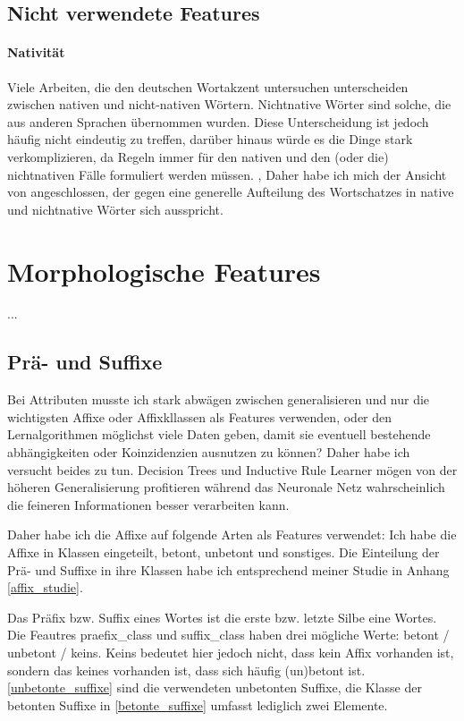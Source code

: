 \subsection{Nicht verwendete Features}
\paragraph*{Nativität}
Viele Arbeiten, die den deutschen Wortakzent untersuchen unterscheiden zwischen nativen und nicht-nativen Wörtern. Nichtnative Wörter sind solche, die aus anderen Sprachen übernommen wurden. Diese Unterscheidung ist jedoch häufig nicht eindeutig zu treffen, darüber hinaus würde es die Dinge stark verkomplizieren, da Regeln immer für den nativen und den (oder die) nichtnativen Fälle formuliert werden müssen. \cite[S.~76ff]{Giegerich1985}, \cite[S.~17]{Mengel1998}
Daher habe ich mich der Ansicht von  \cite[S.~43]{Kaltenbacher1994} angeschlossen, der gegen eine generelle Aufteilung des Wortschatzes in native und nichtnative Wörter sich ausspricht.

\section{Morphologische Features}

...\cite[S.~3]{Janssen2003}

\subsection{Prä- und Suffixe}

Bei Attributen musste ich stark abwägen zwischen generalisieren und nur die wichtigsten Affixe oder Affixkllassen als Features verwenden, oder den Lernalgorithmen möglichst viele Daten geben, damit sie eventuell bestehende abhängigkeiten oder Koinzidenzien ausnutzen zu können? Daher habe ich versucht beides zu tun. Decision Trees und Inductive Rule Learner mögen von der höheren Generalisierung profitieren während das Neuronale Netz wahrscheinlich die feineren Informationen besser verarbeiten kann.

Daher habe ich die Affixe auf folgende Arten als Features verwendet: Ich habe die Affixe in Klassen eingeteilt, betont, unbetont und sonstiges. Die Einteilung der Prä- und Suffixe in ihre Klassen habe ich entsprechend meiner Studie in Anhang \ref{affix_studie}. 

Das Präfix bzw. Suffix eines Wortes ist die erste bzw. letzte Silbe eine Wortes. Die Feautres praefix\_class und suffix\_class haben drei mögliche Werte: betont / unbetont / keins. Keins bedeutet hier jedoch nicht, dass kein Affix vorhanden ist, sondern das keines vorhanden ist, dass sich häufig (un)betont ist. \ref{unbetonte_suffixe} sind die verwendeten unbetonten Suffixe, die Klasse der betonten Suffixe in \ref{betonte_suffixe} umfasst lediglich zwei Elemente.

